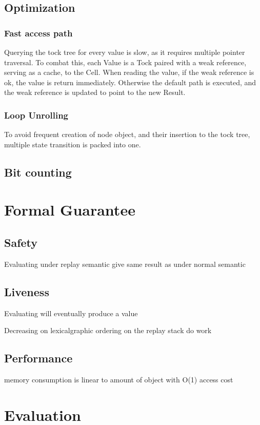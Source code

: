 \documentclass[acmsmall]{acmart}
\begin{document}
	\subsection{Optimization}
	\subsubsection{Fast access path}
	Querying the tock tree for every value is slow, as it requires multiple pointer traversal.
	To combat this, each Value is a Tock paired with a weak reference, serving as a cache, to the Cell. When reading the value, if the weak reference is ok, the value is return immediately. Otherwise the default path is executed, and the weak reference is updated to point to the new Result.
	\subsubsection{Loop Unrolling}
	To avoid frequent creation of node object, and their insertion to the tock tree, multiple state transition is packed into one.
	\subsection{Bit counting}
	\section{Formal Guarantee}
	\subsection{Safety}
	Evaluating under replay semantic give same result as under normal semantic
	\subsection{Liveness}
	Evaluating will eventually produce a value
	
	Decreasing on lexicalgraphic ordering on the replay stack do work
	\subsection{Performance}
	memory consumption is linear to amount of object with O(1) access cost
	\section{Evaluation}
\appendix
\end{document}
